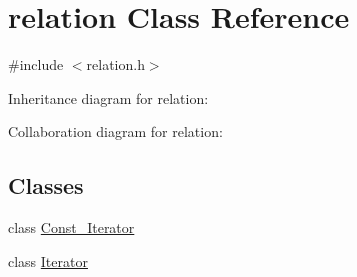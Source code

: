 \hypertarget{classrelation}{}\section{relation Class Reference}
\label{classrelation}


{\ttfamily \#include $<$relation.\+h$>$}



Inheritance diagram for relation\+:


Collaboration diagram for relation\+:
\subsection*{Classes}
\begin{DoxyCompactItemize}
\item 
class \hyperlink{classrelation_1_1Const__Iterator}{Const\+\_\+\+Iterator}
\item 
class \hyperlink{classrelation_1_1Iterator}{Iterator}
\end{DoxyCompactItemize}
